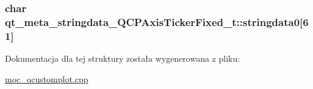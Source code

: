 \subsubsection[{\texorpdfstring{stringdata0}{stringdata0}}]{\setlength{\rightskip}{0pt plus 5cm}char qt\+\_\+meta\+\_\+stringdata\+\_\+\+Q\+C\+P\+Axis\+Ticker\+Fixed\+\_\+t\+::stringdata0\mbox{[}61\mbox{]}}\hypertarget{structqt__meta__stringdata___q_c_p_axis_ticker_fixed__t_a4624793f0a8202895228fd43a030e135}{}\label{structqt__meta__stringdata___q_c_p_axis_ticker_fixed__t_a4624793f0a8202895228fd43a030e135}


Dokumentacja dla tej struktury została wygenerowana z pliku\+:\begin{DoxyCompactItemize}
\item 
\hyperlink{moc__qcustomplot_8cpp}{moc\+\_\+qcustomplot.\+cpp}\end{DoxyCompactItemize}
